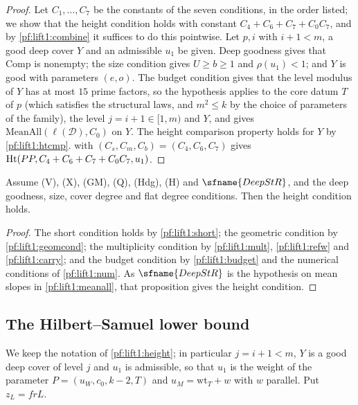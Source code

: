 \begin{proof}
Let $C_1,\dots,C_7$ be the constants of the seven conditions, in the order listed; we show that the
height condition holds with constant $C_4+C_6+C_7+C_0C_7$, and by \cref{pf:lift1:combine} it suffices
to do this pointwise. Let $p,i$ with $i+1<m$, a good deep cover $Y$ and an admissible $u_1$ be given.
Deep goodness gives that $\mathrm{Comp}$ is nonempty; the size condition gives $U\ge b\ge1$ and
$\rho(u_1)<1$; and $Y$ is good with parameters $(e,o)$. The budget condition gives that the level modulus
of $Y$ has at most $15$ prime factors, so the hypothesis applies to the core datum $T$ of $p$ (which
satisfies the structural laws, and $m^2\le k$ by the choice of parameters of the family), the level
$j=i+1\in[1,m)$ and $Y$, and gives $\mathrm{MeanAll}(\ell(\mathcal D),C_0)$ on $Y$. The height comparison
property holds for $Y$ by \cref{pf:lift1:htcmp}.  with
$(C_s,C_m,C_b)=(C_4,C_6,C_7)$ gives $\mathrm{Ht}(PP,C_4+C_6+C_7+C_0C_7,u_1)$.
\end{proof}

\begin{theorem}\label{pf:lift1:height-thm}
Assume (V), (X), (GM), (Q), (Hdg), (H) and $\sfname{DeepStR}$, and the deep goodness, size, cover
degree and flat degree conditions. Then the height condition holds.
\end{theorem}

\begin{proof}
The short condition holds by \cref{pf:lift1:short}; the geometric condition by \cref{pf:lift1:geomcond};
the multiplicity condition by \cref{pf:lift1:mult}, \cref{pf:lift1:refw} and \cref{pf:lift1:carry}; and the budget
condition by \cref{pf:lift1:budget} and the numerical conditions of \cref{pf:lift1:num}. As
$\sfname{DeepStR}$ is the hypothesis on mean slopes in \cref{pf:lift1:meanall}, that proposition gives the
height condition.
\end{proof}

\subsection{The Hilbert--Samuel lower bound}\label{pf:lift1:hs}

We keep the notation of \cref{pf:lift1:height}; in particular $j=i+1<m$, $Y$ is a good deep cover of
level $j$ and $u_1$ is admissible, so that $u_1$ is the weight of the parameter $P=(u_W,c_0,k-2,T)$ and
$u_M=\mathrm{wt}_T+w$ with $w$ parallel. Put $z_L=frL$.

